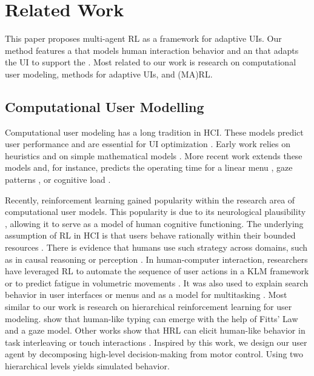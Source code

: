 
\section{Related Work}
\label{sec:related}
This paper proposes multi-agent RL as a framework for adaptive UIs. Our method features a \useragent that models human interaction behavior and an \interfaceagent that adapts the UI to support the \useragent.
Most related to our work is research on computational user modeling, methods for adaptive UIs, and (MA)RL.

\subsection{Computational User Modelling}
Computational user modeling has a long tradition in HCI. These models predict user performance and are essential for UI optimization \cite{oulasvirta2018computational}. Early work relies on heuristics \cite{card1986model, card1980klm, card1983the, kieras1997overview, anderson1997act} and on simple mathematical models \cite{fitts1954information, hick1952rate}.
More recent work extends these models and, for instance, predicts the operating time for a linear menu \cite{10.1145/1240624.1240723}, gaze patterns \cite{salvucci2001integrated}, or cognitive load \cite{duchowski2018index}.

Recently, reinforcement learning gained popularity within the research area of computational user models.
This popularity is due to its neurological plausibility \cite{botvinick2012hierarchical, frank2012mechanisms}, allowing it to serve as a model of human cognitive functioning.
The underlying assumption of RL in HCI is that users behave rationally within their bounded resources \cite{gershman2015computational, oulasvirta2022computational}.
There is evidence that humans use such strategy across domains, such as in causal reasoning \cite{denison2013rational} or perception \cite{gershman2012multistability}.
In human-computer interaction, researchers have leveraged RL to automate the sequence of user actions in a KLM framework \cite{leino2019computer} or to predict fatigue in volumetric movements \cite{cheema2020predicting}.
It was also used to explain search behavior in user interfaces \cite{yang2020predicting} or menus \cite{chen2015emergence} and as a model for multitasking \cite{jokinen2021multitasking}.
Most similar to our work is research on hierarchical reinforcement learning for user modeling.
\citeauthor{jokinen2021touchscreen} \cite{jokinen2021touchscreen} show that human-like typing can emerge with the help of Fitts' Law and a gaze model.
Other works show that HRL can elicit human-like behavior in task interleaving \cite{gebhardt2020hierarchical} or touch interactions \cite{jokinen2021touchscreen}.
Inspired by this work, we design our user agent by decomposing high-level decision-making from motor control.
Using two hierarchical levels yields simulated behavior.

